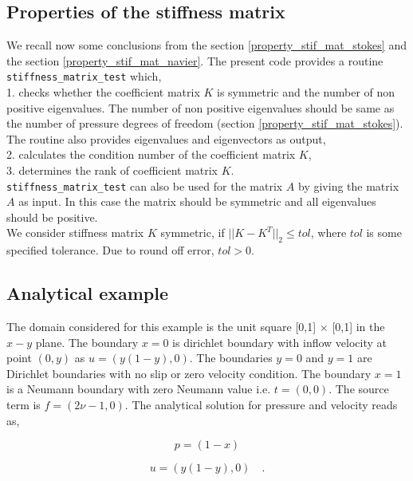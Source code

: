\documentclass[a4paper,openany]{book}
\begin{document}
\subsection{Properties of the stiffness matrix}

We recall now some conclusions from the section \ref{property_stif_mat_stokes} and the section \ref{property_stif_mat_navier}. The present code provides a routine \verb|stiffness_matrix_test| which, \\

1. checks whether the coefficient matrix $K$ is symmetric and the number of non positive eigenvalues. The number of non positive eigenvalues should be same as the number of pressure degrees of freedom (section \ref{property_stif_mat_stokes}). The routine also provides eigenvalues and eigenvectors as output,\\

2. calculates the condition number of the coefficient matrix $K$, \\

3. determines the rank of coefficient matrix $K$.\\

\verb|stiffness_matrix_test| can also be used for the matrix $A$ by giving the matrix $A$ as input. In this case the matrix should be symmetric and all eigenvalues should be positive.\\

We consider stiffness matrix $K$ symmetric, if $||K-K^T||_2 \leq tol$, where $tol$ is some specified tolerance. Due to round off error, $tol > 0$.   

\subsection{Analytical example}

The domain considered for this example is the unit square [0,1] $\times$ [0,1] in the $x-y$ plane. 
The boundary ${x=0}$ is dirichlet boundary with inflow velocity at point $(0,y)$ as $u = (y(1-y), 0)$. The boundaries ${y = 0}$ and ${y = 1}$ are Dirichlet boundaries with no slip or zero velocity condition. The boundary ${x = 1}$ is a Neumann boundary with zero Neumann value i.e. $t = (0, 0)$. The source term is $f = (2 \nu - 1, 0)$. The analytical solution for pressure and velocity reads as,

\begin{center}

\begin{equation}
p = (1 - x)
\end{equation}

\begin{equation} 
 u = (y(1-y), 0) \quad \textrm{.}
\end{equation}

\end{center}
\end{document}
